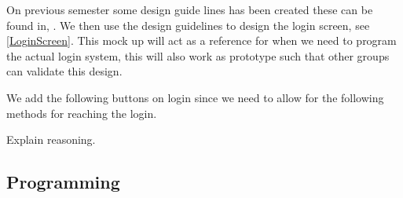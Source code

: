 On previous semester some design guide lines has been created these can be
found in, . We then use the design
guidelines to design the login screen, see \autoref{LoginScreen}. This mock up
will act as a reference for when we need to program the actual login system,
this will also work as prototype such that other groups can validate this
design. 

We add the following buttons on login since we need to allow for the
following methods for reaching the login.


Explain reasoning.

\subsection{Programming}



